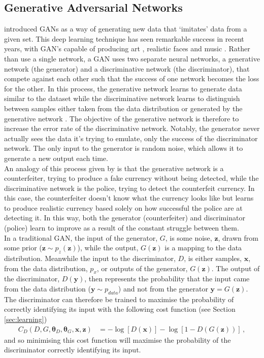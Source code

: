 \documentclass[11pt,a4paper,onecolumn]{report}
\begin{document}
\subsection{Generative Adversarial Networks}
\label{sec:gan}
\citet{Goodfellow2014} introduced GANs as a way of generating new data that
`imitates' data from a given set. This deep learning technique has seen
remarkable success in recent years, with GAN's capable of producing art
\cite{elgammal_can_2017}, realistic faces \cite{karras_style-based_2019} and
music \citep{yu_conditional_2021}. Rather than use a single network, a GAN uses
two separate neural networks, a generative network (the generator) and a
discriminative network (the discriminator), that compete against each other such
that the success of one network becomes the loss for the other. In this process,
the generative network learns to generate data similar to the dataset while the
discriminative network learns to distinguish between samples either taken from
the data distribution or generated by the generative network
\citep{Goodfellow2014}. The objective of the generative network is therefore to
increase the error rate of the discriminative network. Notably, the generator
never actually sees the data it's trying to emulate, only the success of the
discriminator network. The only input to the generator is random noise, which
allows it to generate a new output each time. \\

An analogy of this process given by \citet{Goodfellow2014} is that the
generative network is a counterfeiter, trying to produce a fake currency without
being detected, while the discriminative network is the police, trying to detect
the counterfeit currency. In this case, the counterfeiter doesn't know what the
currency looks like but learns to produce realistic currency based solely on
how successful the police are at detecting it. In this way, both the generator
(counterfeiter) and discriminator (police) learn to improve as a result of the
constant struggle between them.\\

In a traditional GAN, the input of the generator, $G$, is some noise, \(\bm{z}\),
drawn from some prior (\(\bm{z} \sim  p_z(\bm{z})\)), while
the output, \(G(\bm{z})\) is a mapping to the data distribution. Meanwhile the
input to the discriminator, $D$, is either samples, \(\bm{x}\), from the data
distribution, \(p_x\), or outputs of the generator, \(G(\bm{z})\). The output of
the discriminator, \(D(\bm{y})\), then represents the probability that the input
came from the data distribution (\( \bm{y} \sim p_{data}\)) and not from the
generator \(\bm{y} = G(\bm{z})\). The discriminator can therefore be trained to
maximise the probability of correctly identifying its input with the
following cost function (see Section \ref{sec:learning})
\begin{align}
  C_D(D, G, \bm{\theta}_D, \bm{\theta}_G, \bm{x}, \bm{z}) &=
  -\log[D(\bm{x})] - \log[1 - D(G(\bm{z}))]\,,
\end{align}
and so minimising this cost function will maximise the probability of the
discriminator correctly identifying its input.\\
\end{document}
